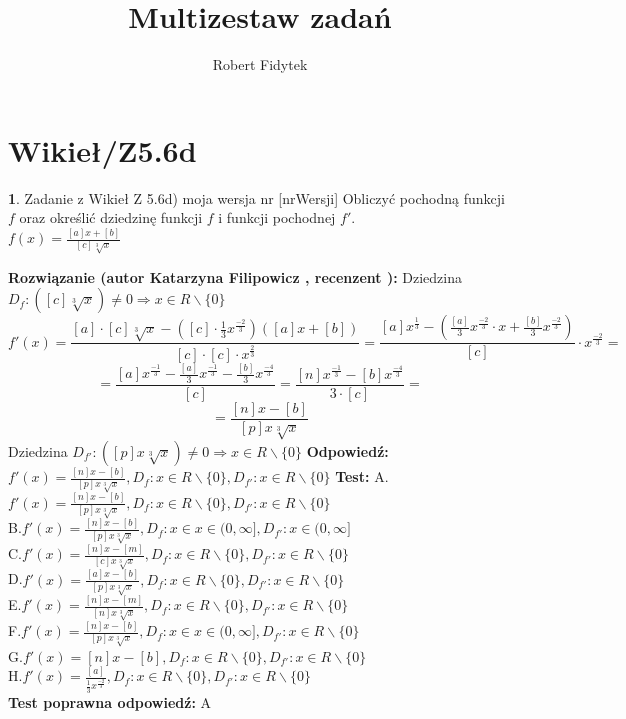 \documentclass[12pt, a4paper]{article}
\title{Multizestaw zadań}
\author{Robert Fidytek}
\date{}
\theoremstyle{definition} %
\newtheorem{zad}{}
\newcommand{\kategoria}[1]{\section{#1}} %
\newcommand{\zadStart}[1]{\begin{zad}#1\newline} %
\newcommand{\zadStop}{\end{zad}}   %
\newcommand{\rozwStart}[2]{\noindent \textbf{Rozwiązanie (autor #1 , recenzent #2): }\newline} %
\newcommand{\rozwStop}{\newline}                                            %
\newcommand{\odpStart}{\noindent \textbf{Odpowiedź:}\newline}    %
\newcommand{\odpStop}{\newline}                                             %
\newcommand{\testStart}{\noindent \textbf{Test:}\newline} %
\newcommand{\testStop}{\newline} %
\newcommand{\kluczStart}{\noindent \textbf{Test poprawna odpowiedź:}\newline} %
\newcommand{\kluczStop}{\newline} %
\begin{document}
\maketitle


\kategoria{Wikieł/Z5.6d}
\zadStart{Zadanie z Wikieł Z 5.6d) moja wersja nr [nrWersji]}
Obliczyć pochodną funkcji $f$ oraz określić dziedzinę funkcji $f$ i funkcji pochodnej $f'$.\\
$f(x)=\frac{[a]x+[b]}{[c]\sqrt[3]{x}}$
\zadStop
\rozwStart{Katarzyna Filipowicz}{}
Dziedzina $D_f: ([c]\sqrt[3]{x}) \neq 0 \Rightarrow  x \in R\backslash \{0\}$
$$
f'(x)=\frac{[a]\cdot [c]\sqrt[3]{x}-\left([c] \cdot\frac{1}{3}x^{\frac{-2}{3}}\right)\left([a]x+[b]\right)}{[c] \cdot [c] \cdot x^{\frac{2}{3}}}=
\frac{[a]x^{\frac{1}{3}}-\left( \frac{[a]}{3}x^{\frac{-2}{3}}\cdot x + \frac{[b]}{3}x^{\frac{-2}{3}}\right)}{[c]}\cdot x^{\frac{-2}{3}}=
$$ $$
=\frac{[a]x^{\frac{-1}{3}}- \frac{[a]}{3}x^{\frac{-1}{3}} - \frac{[b]}{3}x^{\frac{-4}{3}}}{[c]}=
\frac{[n]x^{\frac{-1}{3}}- [b]x^{\frac{-4}{3}}}{3 \cdot [c]}=
$$ $$
=\frac{[n]x-[b]}{[p]x\sqrt[3]{x}}
$$
Dziedzina $D_{f'}: ([p]x\sqrt[3]{x}) \neq 0  \Rightarrow   x \in R\backslash \{0\}$
\rozwStop
\odpStart
$f'(x)=\frac{[n]x-[b]}{[p]x\sqrt[3]{x}}, D_f:x \in R\backslash \{0\}, D_{f'}:x \in R\backslash \{0\}$
\odpStop
\testStart
A.$f'(x)=\frac{[n]x-[b]}{[p]x\sqrt[3]{x}}, D_f:x \in R\backslash \{0\}, D_{f'}:x \in R\backslash \{0\}$\\
B.$f'(x)=\frac{[n]x-[b]}{[p]x\sqrt[3]{x}}, D_f:x \in x \in (0,\infty], D_{f'}:x  \in (0,\infty]$\\
C.$f'(x)=\frac{[n]x-[m]}{[c]x\sqrt[3]{x}}, D_f:x \in R\backslash \{0\}, D_{f'}:x \in R\backslash \{0\}$\\
D.$f'(x)=\frac{[a]x-[b]}{[p]x\sqrt[3]{x}}, D_f:x \in R\backslash \{0\}, D_{f'}:x \in R\backslash \{0\}$\\
E.$f'(x)=\frac{[n]x-[m]}{[n]x\sqrt[3]{x}}, D_f:x \in R\backslash \{0\}, D_{f'}:x \in R\backslash \{0\}$\\
F.$f'(x)=\frac{[n]x-[b]}{[p]x\sqrt[3]{x}}, D_f:x \in x \in (0,\infty], D_{f'}:x \in R\backslash \{0\}$\\
G.$f'(x)=[n]x-[b], D_f:x \in R\backslash \{0\}, D_{f'}:x \in R\backslash \{0\}$\\
H.$f'(x)=\frac{[a]}{\frac{1}{3}x^{\frac{-2}{3}}}, D_f:x \in R\backslash \{0\}, D_{f'}:x \in R\backslash \{0\}$\\
\testStop
\kluczStart
A
\kluczStop
\end{document}

